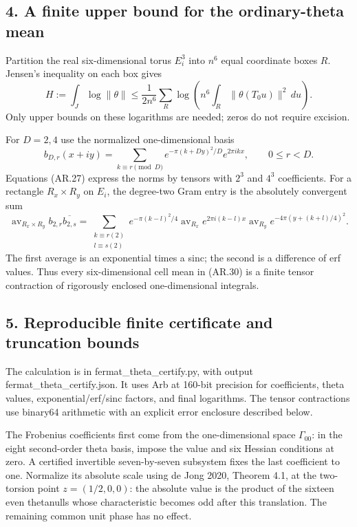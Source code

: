 \subsection{4. A finite upper bound for the ordinary-theta
mean}\label{a-finite-upper-bound-for-the-ordinary-theta-mean}

Partition the real six-dimensional torus \(E_i^3\) into \(n^6\) equal
coordinate boxes \(R\). Jensen's inequality on each box gives \[
H:=\int_J\log\|\theta\|
\le\frac1{2n^6}\sum_R
        \log\left(n^6\int_R\|\theta(T_0u)\|^2\,du\right).
\tag{AR.30}
\] Only upper bounds on these logarithms are needed; zeros do not
require excision.

For \(D=2,4\) use the normalized one-dimensional basis \[
b_{D,r}(x+iy)=
\sum_{k\equiv r\pmod D}
 e^{-\pi(k+Dy)^2/D}e^{2\pi ikx},
\qquad 0\le r<D.
\] Equations (AR.27) express the norms by tensors with \(2^3\) and
\(4^3\) coefficients. For a rectangle \(R_x\times R_y\) on \(E_i\), the
degree-two Gram entry is the absolutely convergent sum \[
\operatorname{av}_{R_x\times R_y}
 b_{2,r}\overline{b_{2,s}}
=\sum_{\substack{k\equiv r(2)\\l\equiv s(2)}}
 e^{-\pi(k-l)^2/4}
 \operatorname{av}_{R_x}e^{2\pi i(k-l)x}
 \operatorname{av}_{R_y}e^{-4\pi(y+(k+l)/4)^2}.
\tag{AR.31}
\] The first average is an exponential times a sinc; the second is a
difference of erf values. Thus every six-dimensional cell mean in
(AR.30) is a finite tensor contraction of rigorously enclosed
one-dimensional integrals.

\subsection{5. Reproducible finite certificate and truncation
bounds}\label{reproducible-finite-certificate-and-truncation-bounds}

The calculation is in fermat\_theta\_certify.py, with output
fermat\_theta\_certify.json. It uses Arb at 160-bit precision for
coefficients, theta values, exponential/erf/sinc factors, and final
logarithms. The tensor contractions use binary64 arithmetic with an
explicit error enclosure described below.

The Frobenius coefficients first come from the one-dimensional space
\(\Gamma_{00}\): in the eight second-order theta basis, impose the value
and six Hessian conditions at zero. A certified invertible
seven-by-seven subsystem fixes the last coefficient to one. Normalize
its absolute scale using de Jong 2020, Theorem 4.1, at the two-torsion
point \(z=(1/2,0,0)\): the absolute value is the product of the sixteen
even thetanulls whose characteristic becomes odd after this translation.
The remaining common unit phase has no effect.

